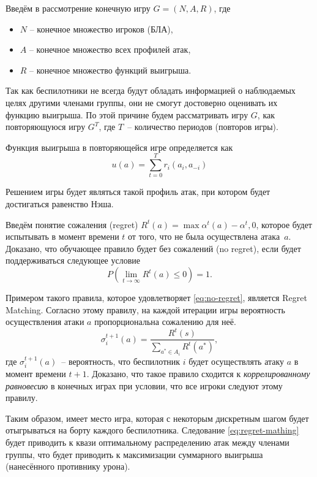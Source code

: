Введём в рассмотрение конечную игру $ G = (N, A, R) $, где
\begin{itemize}
    \item $ N $ -- конечное множество игроков (БЛА),
    \item $ A $ -- конечное множество всех профилей атак,
    \item $ R $ -- конечное множество функций выигрыша.
\end{itemize}

Так как беспилотники не всегда будут обладать информацией о наблюдаемых целях другими членами группы, они не смогут достоверно оценивать их функцию выигрыша.
По этой причине будем рассматривать игру $ G $, как повторяющуюся игру  $ G^T $, где $ T $~-- количество периодов (повторов игры).


Функция выигрыша в повторяющейся игре определяется как
\begin{equation}
    u(a) = \sum_{t=0}^{T} r_i(a_i, a_{-i})
\end{equation}

Решением игры будет являться такой профиль атак, при котором будет достигаться равенство Нэша.

Введём понятие сожаления (regret) $ R^t(a) = \max{\alpha^t(a) - \alpha^t, 0} $, которое будет испытывать в момент времени $ t $ от того, что не была осуществлена атака~$ a $.
Доказано, что обучающее правило будет без сожалений (no regret), если будет поддерживаться следующее условие
\begin{equation} \label{eq:no-regret}
    P(\lim\limits_{t \rightarrow \infty} R^t(a) \le 0) = 1 .
\end{equation}

Примером такого правила, которое удовлетворяет \eqref{eq:no-regret}, является Regret Matching.
Согласно этому правилу, на каждой итерации игры вероятность осуществления атаки $ a $ пропорциональна сожалению для неё.
\begin{equation} \label{eq:regret-mathing}
    \sigma_{i}^{t+1}(a) = \frac{R^t(s)}{\sum_{a^* \in A_i} R^t(a^*)} ,
\end{equation}
где $ \sigma_{i}^{t+1}(a) $~-- вероятность, что беспилотник $ i $ будет осуществлять атаку $ a $ в момент времени $ t + 1 $.
Доказано, что такое правило сходится к \textit{коррелированному равновесию} в конечных играх при условии, что все игроки следуют этому правилу.

Таким образом, имеет место игра, которая с некоторым дискретным шагом будет отыгрываться на борту каждого беспилотника.
Следование \eqref{eq:regret-mathing} будет приводить к квази оптимальному распределению атак между членами группы, что будет приводить к максимизации суммарного выигрыша (нанесённого противнику урона).